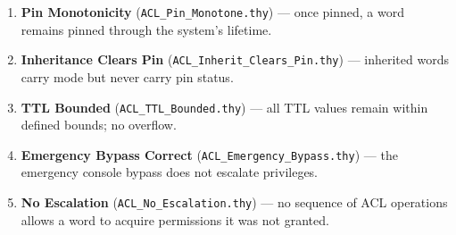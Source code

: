 \begin{enumerate}
  \item \textbf{Pin Monotonicity} (\texttt{ACL\_Pin\_Monotone.thy}) — once pinned,
        a word remains pinned through the system's lifetime.
  \item \textbf{Inheritance Clears Pin} (\texttt{ACL\_Inherit\_Clears\_Pin.thy}) — inherited words
        carry mode but never carry pin status.
  \item \textbf{TTL Bounded} (\texttt{ACL\_TTL\_Bounded.thy}) — all TTL values
        remain within defined bounds; no overflow.
  \item \textbf{Emergency Bypass Correct} (\texttt{ACL\_Emergency\_Bypass.thy}) —
        the emergency console bypass does not escalate privileges.
  \item \textbf{No Escalation} (\texttt{ACL\_No\_Escalation.thy}) —
        no sequence of ACL operations allows a word to acquire permissions
        it was not granted.
\end{enumerate}

